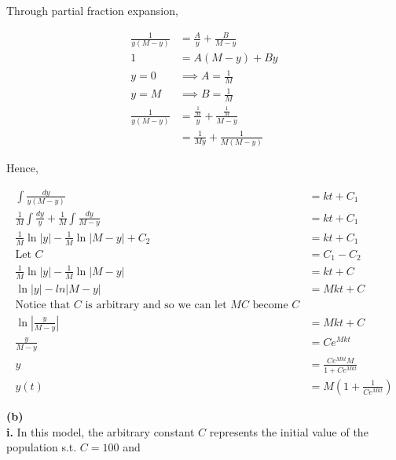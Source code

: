 \documentclass{article}
\begin{document}
    Through partial fraction expansion,

    \begin{align*}
        \frac{1}{y(M-y)}    &= \frac{A}{y} + \frac{B}{M-y} \\
        1                   &= A(M-y) + By \\
        y=0                 &\implies A = \frac{1}{M} \\
        y=M                 &\implies B = \frac{1}{M} \\
        \frac{1}{y(M-y)}    &= \frac{\frac{1}{M}}{y} + \frac{\frac{1}{M}}{M-y} \\
                            &= \frac{1}{My} + \frac{1}{M(M-y)}
    \end{align*}

    \pagebreak
    \thispagestyle{4}

    Hence,

    \begin{align*}
        \int \frac{dy}{y(M-y)}  &= kt + C_1 \\
        \frac{1}{M} \int \frac{dy}{y} + \frac{1}{M}\int \frac{dy}{M-y}   &= kt + C_1 \\
        \frac{1}{M}\ln{|y|} - \frac{1}{M} \ln{|M-y|} + C_2               &= kt + C_1 \\
        \text{Let } C                                                    &= C_1 - C_2 \\
        \frac{1}{M}\ln{|y|} - \frac{1}{M}\ln{|M-y|}                      &= kt + C \\
        \ln{|y|} - ln{|M-y|}                                             &= Mkt + C \\
        \text{Notice that $C$ is arbitrary and so we can let $MC$ become $C$} \\
        \ln{\left|\frac{y}{M-y}\right|}                                 &= Mkt + C \\
        \frac{y}{M-y}                                                   &= Ce^{Mkt} \\
        y                                                               &= \frac{Ce^{Mkt}M}{1+Ce^{Mkt}} \\
        y(t)                                                            &= M\left(1+\frac{1}{Ce^{Mkt}}\right)
    \end{align*}

    \textbf{(b)} \\
    \textbf{i. } In this model, the arbitrary constant $C$ represents the initial value of the population s.t. $C=100$ and
\end{document}
